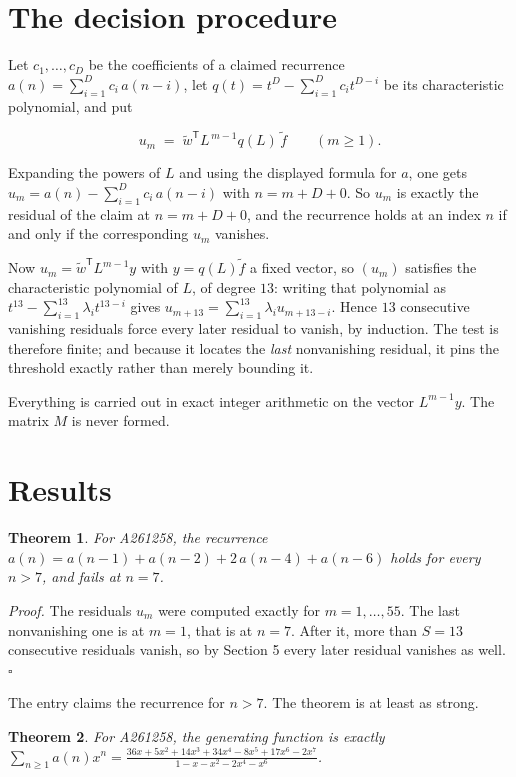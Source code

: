 \documentclass[11pt]{article}
\newtheorem{theorem}{Theorem}
\theoremstyle{definition}
\begin{document}
\section{The decision procedure}

Let $c_1,\dots,c_D$ be the coefficients of a claimed recurrence $a(n) = \sum_{i=1}^{D} c_i\,a(n-i)$, let $q(t) = t^{D} - \sum_{i=1}^{D} c_i t^{D-i}$ be its characteristic polynomial, and put

\[u_m \;=\; \tilde w^{\mathsf T} L^{\,m-1} q(L)\,\tilde f \qquad (m \ge 1).\]

Expanding the powers of $L$ and using the displayed formula for $a$, one gets $u_m = a(n) - \sum_{i=1}^{D} c_i\,a(n-i)$ with $n = m + D + 0$. So $u_m$ is exactly the residual of the claim at $n = m + D + 0$, and the recurrence holds at an index $n$ if and only if the corresponding $u_m$ vanishes.

Now $u_m = \tilde w^{\mathsf T} L^{m-1} y$ with $y = q(L)\tilde f$ a fixed vector, so $(u_m)$ satisfies the characteristic polynomial of $L$, of degree $13$: writing that polynomial as $t^{13} - \sum_{i=1}^{13} \lambda_i t^{13-i}$ gives $u_{m+13} = \sum_{i=1}^{13} \lambda_i u_{m+13-i}$. Hence $13$ consecutive vanishing residuals force every later residual to vanish, by induction. The test is therefore finite; and because it locates the {\itshape last} nonvanishing residual, it pins the threshold exactly rather than merely bounding it.

Everything is carried out in exact integer arithmetic on the vector $L^{m-1}y$. The matrix $M$ is never formed.

\section{Results}

\begin{theorem} For A261258, the recurrence $a(n) = a(n-1) + a(n-2) + 2\,a(n-4) + a(n-6)$ holds for every $n > 7$, and fails at $n = 7$.\end{theorem}

{\itshape Proof.} The residuals $u_m$ were computed exactly for $m = 1,\dots,55$. The last nonvanishing one is at $m = 1$, that is at $n = 7$. After it, more than $S = 13$ consecutive residuals vanish, so by Section 5 every later residual vanishes as well. $\square$

The entry claims the recurrence for $n > 7$. The theorem is at least as strong.

\begin{theorem} For A261258, the generating function is exactly $\sum_{n\ge 1} a(n)x^n = \frac{36x + 5x^{2} + 14x^{3} + 34x^{4} - 8x^{5} + 17x^{6} - 2x^{7}}{1 - x - x^{2} - 2x^{4} - x^{6}}$.\end{theorem}
\end{document}
